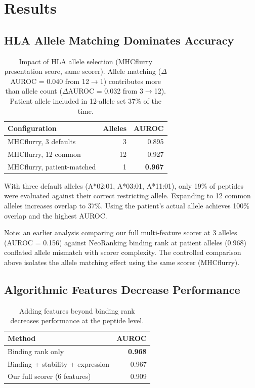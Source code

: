 \documentclass[11pt,twocolumn]{article}
\begin{document}
\section{Results}

\subsection{HLA Allele Matching Dominates Accuracy}

\begin{table}[ht]
\centering
\footnotesize
\begin{tabular}{@{}lrr@{}}
\toprule
Configuration & Alleles & AUROC \\
\midrule
MHCflurry, 3 defaults & 3 & 0.895 \\
MHCflurry, 12 common & 12 & 0.927 \\
MHCflurry, patient-matched & 1 & \textbf{0.967} \\
\bottomrule
\end{tabular}
\caption{Impact of HLA allele selection (MHCflurry presentation score, same scorer). Allele matching ($\Delta$AUROC = 0.040 from 12$\to$1) contributes more than allele count ($\Delta$AUROC = 0.032 from 3$\to$12). Patient allele included in 12-allele set 37\% of the time.}
\end{table}

With three default alleles (A*02:01, A*03:01, A*11:01), only 19\% of peptides were evaluated against their correct restricting allele. Expanding to 12 common alleles increases overlap to 37\%. Using the patient's actual allele achieves 100\% overlap and the highest AUROC.

Note: an earlier analysis comparing our full multi-feature scorer at 3 alleles (AUROC = 0.156) against NeoRanking binding rank at patient alleles (0.968) conflated allele mismatch with scorer complexity. The controlled comparison above isolates the allele matching effect using the same scorer (MHCflurry).

\subsection{Algorithmic Features Decrease Performance}

\begin{table}[ht]
\centering
\footnotesize
\begin{tabular}{@{}lr@{}}
\toprule
Method & AUROC \\
\midrule
Binding rank only & \textbf{0.968} \\
Binding + stability + expression & 0.967 \\
Our full scorer (6 features) & 0.909 \\
\bottomrule
\end{tabular}
\caption{Adding features beyond binding rank decreases performance at the peptide level.}
\end{table}
\end{document}
